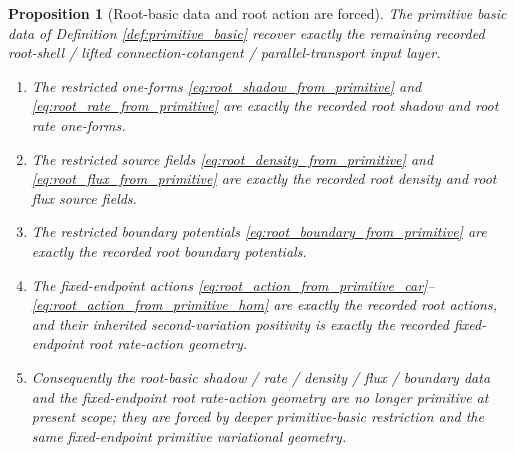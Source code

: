 \documentclass[11pt]{article}
\newtheorem{proposition}{Proposition}
\begin{document}
\begin{proposition}[Root-basic data and root action are forced]
\label{prop:root_basic_forced}
The primitive basic data of Definition \ref{def:primitive_basic} recover exactly the remaining recorded root-shell / lifted connection-cotangent / parallel-transport input layer.
\begin{enumerate}
    \item The restricted one-forms \eqref{eq:root_shadow_from_primitive} and \eqref{eq:root_rate_from_primitive} are exactly the recorded root shadow and root rate one-forms.
    \item The restricted source fields \eqref{eq:root_density_from_primitive} and \eqref{eq:root_flux_from_primitive} are exactly the recorded root density and root flux source fields.
    \item The restricted boundary potentials \eqref{eq:root_boundary_from_primitive} are exactly the recorded root boundary potentials.
    \item The fixed-endpoint actions \eqref{eq:root_action_from_primitive_car}--\eqref{eq:root_action_from_primitive_hom} are exactly the recorded root actions, and their inherited second-variation positivity is exactly the recorded fixed-endpoint root rate-action geometry.
    \item Consequently the root-basic shadow / rate / density / flux / boundary data and the fixed-endpoint root rate-action geometry are no longer primitive at present scope; they are forced by deeper primitive-basic restriction and the same fixed-endpoint primitive variational geometry.
\end{enumerate}
\end{proposition}
\end{document}
